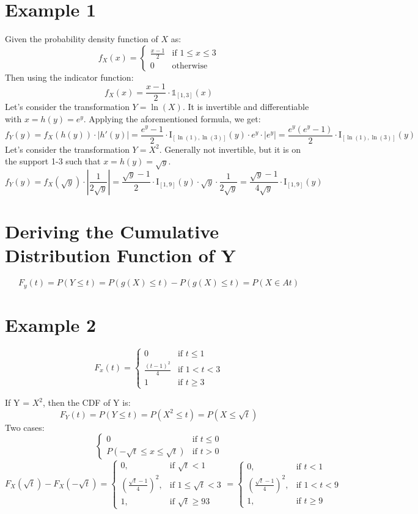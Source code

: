 \section{Example 1}
Given the probability density function of \(X\) as:
\[
f_X(x) =
\begin{cases}
\frac{x-1}{2} & \text{if } 1 \leq x \leq 3 \\
0 & \text{otherwise}
\end{cases}
\]
Then using the indicator function:
\[ f_X(x) = \frac{x-1}{2} \cdot \mathbb{1}_{[1,3]}(x) \]
Let's consider the transformation \(Y = \ln(X)\). It is invertible and differentiable with \(x = h(y) = e^y\). Applying the aforementioned formula, we get:
\[
f_Y(y) = f_X(h(y)) \cdot |h'(y)| = \frac{e^y - 1}{2} \cdot \mathrm{I}_{[\ln(1), \ln(3)]}(y) \cdot e^{y} \cdot |e^{y}| = \frac{e^{y}(e^{y} - 1)}{2} \cdot \mathrm{I}_{[\ln(1), \ln(3)]}(y)
\]
Let's consider the transformation \(Y = X^2\). Generally not invertible, but it is on the support 1-3 such that \(x = h(y) = \sqrt{y}\). 
\[
f_Y(y) = f_X(\sqrt{y}) \cdot \left|\frac{1}{2\sqrt{y}}\right| = \frac{\sqrt{y} - 1}{2} \cdot \mathrm{I}_{[1, 9]}(y) \cdot \sqrt{y} \cdot \frac{1}{2\sqrt{y}} = \frac{\sqrt{y} - 1}{4\sqrt{y}} \cdot \mathrm{I}_{[1, 9]}(y)
\]

\section{Deriving the Cumulative Distribution Function of Y}
\[F_y(t) = P(Y \leq t) = P(g(X) \leq t) - P(g(X) \leq t) = P (X \in At)
\]
\section{Example 2}
\[
F_x(t) = 
\begin{cases}
0 & \text{if } t \leq 1 \\
\frac{(t -1)^2}{4} & \text{if } 1 < t < 3 \\
1 & \text{if } t \geq 3
\end{cases}
\]

If Y = \(X^2\), then the CDF of Y is:
\[
F_Y(t) = P(Y \leq t) = P(X^2 \leq t) = P(X \leq \sqrt{t})
\]
Two cases: 
\[
\begin{cases} 
    0 & \text{if } t \leq 0 \\  P(-\sqrt{t} \leq  x \leq \sqrt{t} ) & \text{if } t > 0 
\end{cases}
\]
\[
F_X(\sqrt{t}) - F_X(-\sqrt{t}) = 
\begin{cases} 
0, & \text{if } \sqrt{t} < 1 \\ 
\left( \frac{\sqrt{t} - 1}{4} \right)^2, & \text{if } 1 \leq \sqrt{t} < 3 \\ 
1, & \text{if } \sqrt{t} \geq 93
\end{cases}
=
\begin{cases}
0, & \text{if } t < 1 \\ 
\left( \frac{\sqrt{t} - 1}{4} \right)^2, & \text{if } 1 < t < 9 \\ 
1, & \text{if } t \geq 9
\end{cases}
\]

